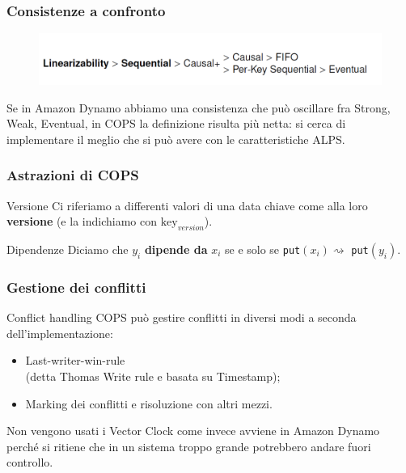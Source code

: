 \begin{frame}
\frametitle{Consistenze a confronto}
	\begin{figure}
		\centering
		\includegraphics[scale=0.35]{COPS/COPS6.png}
	\end{figure}

Se in Amazon Dynamo abbiamo una consistenza che può oscillare fra Strong, Weak, Eventual,
in COPS la definizione risulta più netta: si cerca di implementare il meglio che si può
avere con le caratteristiche ALPS.
\end{frame}

\begin{frame}
\frametitle{Astrazioni di COPS}
\begin{block}{Versione}
Ci riferiamo a differenti valori di una data chiave come alla loro \textbf{versione}
(e la indichiamo con $\text{key}_{version}$).
\end{block}
\begin{block}{Dipendenze}
Diciamo che $y_i$ \textbf{dipende da} $x_i$ se e solo se \texttt{put}$(x_i)
\rightsquigarrow$ \texttt{put}$(y_i)$.
\end{block}
\end{frame}

\begin{frame}
\frametitle{Gestione dei conflitti}
\begin{block}{Conflict handling}
COPS può gestire conflitti in diversi modi a seconda dell'implementazione:
	\begin{itemize}
		\item<1-> Last-writer-win-rule \\
				  (detta Thomas Write rule e basata su Timestamp);
		\item<1-> Marking dei conflitti e risoluzione con altri mezzi.
	\end{itemize}
\end{block}
Non vengono usati i Vector Clock come invece avviene in Amazon Dynamo perché
si ritiene che in un sistema troppo grande potrebbero andare fuori controllo.
\end{frame}

